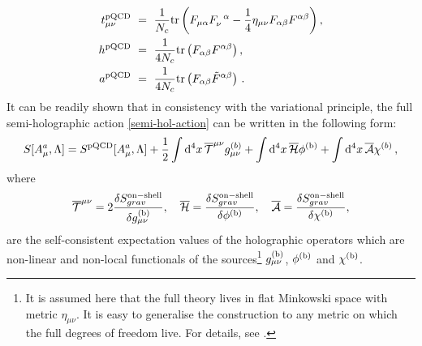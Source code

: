 \documentclass[prd,reprint,a4paper,showpacs,superscriptaddress,11pt,onecolumn,nofootinbib]{revtex4-1}
\renewcommand{\(}{\left(}
\renewcommand{\)}{\right)}
\newcommand{\6}{\partial}
\begin{document}
\begin{align}\label{t-cl}
t^{\rm pQCD}_{\mu\nu} ~ &=  ~ \frac{1}{N_c} {\rm tr} \left(F_{\mu\alpha}F_\nu^{\phantom{\mu}\alpha} - \frac{1}{4}\eta_{\mu\nu}F_{\alpha\beta}F^{\alpha\beta}\right),\nonumber\\
h^{\rm pQCD} ~ &= ~ \frac{1}{4N_c} {\rm tr}\left(F_{\alpha\beta}F^{\alpha\beta}\right),\nonumber\\
a^{\rm pQCD} ~ &= ~ \frac{1}{4N_c} {\rm tr}\left(F_{\alpha\beta}\tilde{F}^{\alpha\beta}\right) \, .
\end{align}
It can be readily shown that in consistency with the variational principle, the full semi-holographic action \eqref{semi-hol-action} can be written in the following form:
\begin{equation}\label{modified-action}
S[A_\mu^a, \Lambda] = S^{\rm pQCD}[A_\mu^a, \Lambda] +\frac{1}{2} \int {\rm d}^4x \, \overline{\mathcal{T}}^{\mu\nu}g^{(b)}_{\mu\nu} + \int {\rm d}^4x \, \overline{\mathcal{H}}\phi^{\rm (b)} + \int {\rm d}^4x \, \overline{\mathcal{A}}\chi^{(b)} \, ,
\end{equation}
where 
\begin{eqnarray}\label{hol-ops}
\overline{\mathcal{T}}^{\mu\nu} = 2 \frac{\delta S^{\rm on-shell}_{grav}}{\delta g^{\rm (b)}_{\mu\nu}}, \quad \overline{\mathcal{H}} = \frac{\delta S^{\rm on-shell}_{grav}}{\delta \phi^{\rm (b)}}, \quad \overline{\mathcal{A}} = \frac{\delta S^{\rm on-shell}_{grav}}{\delta \chi^{\rm (b)}},
\end{eqnarray}
are the self-consistent expectation values of the holographic operators which are non-linear and non-local functionals of the sources\footnote{It is assumed here that the full theory lives in flat Minkowski space with metric $\eta_{\mu\nu}$. It is easy to generalise the construction to any metric on which the full degrees of freedom live. For details, see \cite{Mukhopadhyay:2015smb}.} $g^{\rm (b)}_{\mu\nu}$, $\phi^{\rm (b)}$ and $\chi^{\rm (b)}$. 
\end{document}
